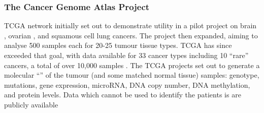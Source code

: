 \subsubsection{The Cancer Genome Atlas Project} \label{TCGA_Intro}
\gls{TCGA} network initially set out to demonstrate utility in a pilot project on brain \citep{TCGA2008GBM}, ovarian \citep{TCGA2011OV}, and squamous cell lung \citep{TCGA2012LUSC} cancers. 
The project then expanded, aiming to analyse 500 samples each for 20-25 \gls{tumour} tissue types. \gls{TCGA} has since exceeded that goal, with data available for 33 cancer types including 10 ``rare'' cancers, a total of over 10,000 samples \citep{TCGA2017web}.
%
The \gls{TCGA} projects set out to generate a molecular ``'' of the \gls{tumour} (and some matched normal tissue) samples: genotype,  \glspl{mutation}, \gls{gene expression}, \gls{microRNA}, \acrshort{DNA} copy number, \acrshort{DNA} methylation, and protein levels. %
Data which cannot be used to identify the patients is are publicly available

\iffalse
